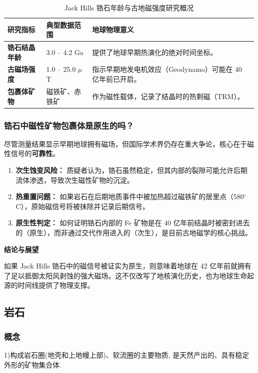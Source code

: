 \documentclass[12pt,a4paper]{article}
\begin{document}
	\begin{table}[htbp]
		\centering
		\caption{Jack Hills 锆石年龄与古地磁强度研究概况}
		\label{tab:zircon_mag}
		\begin{tabularx}{\textwidth}{l l X}
			\toprule
			研究指标 & 典型数据范围 & 地球物理意义 \\
			\midrule
			\textbf{锆石结晶年龄} & 3.0 -- 4.2 Ga & 提供了地球早期热演化的绝对时间坐标。 \\
			\addlinespace
			\textbf{古磁场强度} & 1.0 -- 25.0 $\mu$T & 指示早期地发电机效应（Geodynamo）可能在 40 亿年前已开启。 \\
			\addlinespace
			\textbf{包裹体矿物} & 磁铁矿、赤铁矿 & 作为磁性载体，记录了结晶时的热剩磁（TRM）。 \\
			\bottomrule
		\end{tabularx}
	\end{table}
	
	\subsubsection{锆石中磁性矿物包裹体是原生的吗？}
	尽管测量结果显示早期地球拥有磁场，但国际学术界仍存在重大争论，核心在于磁性信号的\textbf{可靠性}。
	
	\begin{enumerate}
		\item \textbf{次生蚀变风险：} 质疑者认为，锆石虽然稳定，但其内部的裂隙可能允许后期流体渗透，导致次生磁性矿物的沉淀。
		\item \textbf{热重置问题：} 如果岩石在后期地质事件中被加热超过磁铁矿的居里点（580$^\circ$C），原始磁信号将被抹除并记录后期信号。
		\item \textbf{原生性判定：} 如何证明锆石内部的 Fe 矿物是在 40 亿年前结晶时被密封进去的（原生），而非通过交代作用进入的（次生），是目前古地磁学的核心挑战。
	\end{enumerate}
	
	\textbf{结论与展望}
	
	如果 Jack Hills 锆石中的磁信号被证实为原生，则意味着地球在 42 亿年前就拥有了足以抵御太阳风剥蚀的强大磁场。这不仅改写了地核演化历史，也为地球生命起源的时间线提供了物理支撑。
	
	\subsection{岩石}
	\subsubsection{概念}
	1)构成岩石圈(地壳和上地幔上部)、软流圈的主要物质, 是天然产出的、具有稳定外形的矿物集合体.
	
\end{document}
